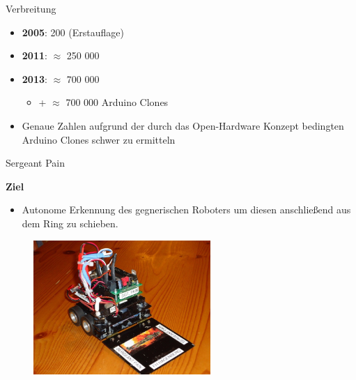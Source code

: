 \documentclass{beamer}
\begin{document}
\begin{frame}{Verbreitung}
\begin{itemize}
	\item \textbf{2005}: 200 (Erstauflage)\cite{IEEE:2016:TheMakingOfArduino}
\end{itemize}
\begin{itemize}
	\item \textbf{2011}: $\approx$ 250 000\cite{IEEE:2016:TheMakingOfArduino}
\end{itemize}
\begin{itemize}
	\item \textbf{2013}: $\approx$ 700 000\cite{Quora:ArduinoSalesNumbers}
	\begin{itemize}
		\item + $\approx$ 700 000 Arduino Clones
	\end{itemize}
\end{itemize}
\vspace{10px}
\begin{itemize}
	\item Genaue Zahlen aufgrund der durch das Open-Hardware Konzept bedingten Arduino Clones schwer zu ermitteln
\end{itemize}
\end{frame}
\begin{frame}{Sergeant Pain}
 \begin{large}\textbf{Ziel}\end{large}
 \begin{itemize}
 	\item Autonome Erkennung des gegnerischen Roboters um diesen anschlie\ss{}end aus dem Ring zu schieben. \href{./videos/sergeant-pain.mp4}{}
 \end{itemize}
 \begin{figure}[H]
  \centering
  \includegraphics[width=0.6\textwidth]{./images/robot-sergeant-pain.jpg}
 \end{figure}
\end{frame}
\end{document}
